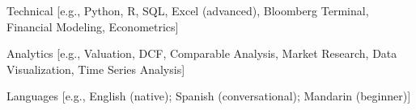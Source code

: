 

\begin{cvskills}

  \cvskill
    {Technical} %
    {[e.g., Python, R, SQL, Excel (advanced), Bloomberg Terminal, Financial Modeling, Econometrics]} %

  \cvskill
    {Analytics} %
    {[e.g., Valuation, DCF, Comparable Analysis, Market Research, Data Visualization, Time Series Analysis]} %

  \cvskill
    {Languages} %
    {[e.g., English (native); Spanish (conversational); Mandarin (beginner)]} %

\end{cvskills}
